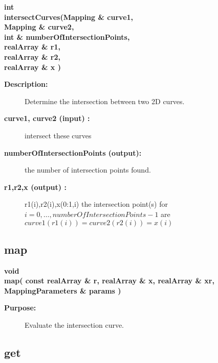 \begin{flushleft} \textbf{%
int  \\ 
\settowidth{\IntersectionMappingIncludeArgIndent}{intersectCurves(}%
intersectCurves(Mapping \& curve1, \\ 
\hspace{\IntersectionMappingIncludeArgIndent}Mapping \& curve2, \\ 
\hspace{\IntersectionMappingIncludeArgIndent}int \& numberOfIntersectionPoints, \\ 
\hspace{\IntersectionMappingIncludeArgIndent}realArray \& r1, \\ 
\hspace{\IntersectionMappingIncludeArgIndent}realArray \& r2,\\ 
\hspace{\IntersectionMappingIncludeArgIndent}realArray \& x )
}\end{flushleft}
\begin{description}
\item[{\bf Description:}]  
   Determine the intersection between two 2D curves.

\item[{\bf curve1, curve2 (input) :}]  intersect these curves
\item[{\bf numberOfIntersectionPoints (output):}]  the number of intersection points found.
\item[{\bf r1,r2,x (output) :}]  r1(i),r2(i),x(0:1,i) the intersection point(s) for $i=0,\ldots,numberOfIntersectionPoints-1$
    are $curve1(r1(i))=curve2(r2(i))=x(i)$
     

\end{description}
\subsection{map}
 
\begin{flushleft} \textbf{%
void  \\ 
\settowidth{\IntersectionMappingIncludeArgIndent}{map(}%
map( const realArray \& r, realArray \& x, realArray \& xr, MappingParameters \& params )
}\end{flushleft}
\begin{description}
\item[{\bf Purpose:}]  Evaluate the intersection curve.
\end{description}
\subsection{get}
 
